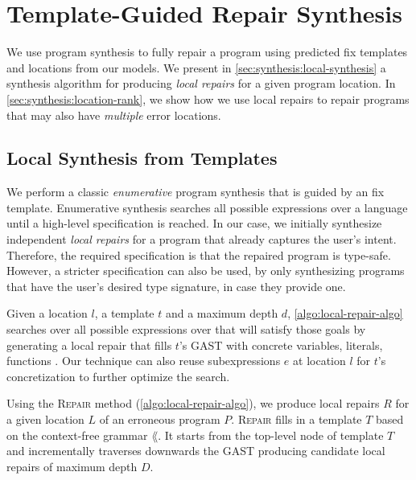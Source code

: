 \section{Template-Guided Repair Synthesis}
\label{sec:synthesis}
We use program synthesis to fully repair a program using predicted fix templates
and locations from our models. We present in
\autoref{sec:synthesis:local-synthesis} a synthesis algorithm for producing
\emph{local repairs} for a given program location. In
\autoref{sec:synthesis:location-rank}, we show how we use local repairs to
repair programs that may also have \emph{multiple} error locations.

\lstMakeShortInline[mathescape=true]{|}

\subsection{Local Synthesis from Templates}
\label{sec:synthesis:local-synthesis}

We perform a classic \emph{enumerative} program synthesis that is guided by an
fix template. Enumerative synthesis searches all possible expressions over a
language until a high-level specification is reached. In our case, we initially
synthesize independent \emph{local repairs} for a program that already captures
the user's intent. Therefore, the required specification is that the repaired
program is type-safe. However, a stricter specification can also be used, by
only synthesizing programs that have the user's desired type signature, in case
they provide one.

Given a location $l$, a template $t$ and a maximum depth $d$,
\autoref{algo:local-repair-algo} searches over all possible expressions over
\lang that will satisfy those goals by generating a local repair that fills
$t$'s GAST with concrete variables, literals, functions \etc. Our technique can
also reuse subexpressions $e$ at location $l$ for $t$'s concretization to
further optimize the search.



Using the \textsc{Repair} method (\autoref{algo:local-repair-algo}), we produce
local repairs $R$ for a given location $L$ of an erroneous program $P$.
\textsc{Repair} fills in a template $T$ based on the context-free grammar
$\lang$. It starts from the top-level node of template $T$ and incrementally
traverses downwards the GAST producing candidate local repairs of maximum depth
$D$.

